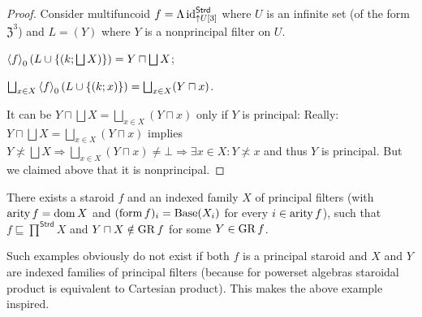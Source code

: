 \begin{proof}
Consider multifuncoid $f=\Lambda\operatorname{id}_{\uparrow U[3]}^{\mathsf{Strd}}$
where $U$ is an infinite set (of the form $\mathfrak{Z}^{3}$) and
$L=(Y)$ where $Y$ is a nonprincipal filter on $U$.

$\left\langle f\right\rangle_{0}\left(L\cup\left\{ \left(k;\bigsqcup X\right)\right\} \right)=Y\sqcap\bigsqcup X$;

$\bigsqcup_{x\in X}\left\langle f\right\rangle_{0}(L\cup\{(k;x)\})=\bigsqcup_{x\in X}(Y\sqcap x)$.

It can be $Y\sqcap\bigsqcup X=\bigsqcup_{x\in X}(Y\sqcap x)$ only
if $Y$ is principal: Really: $Y\sqcap\bigsqcup X=\bigsqcup_{x\in X}(Y\sqcap x)$
implies $Y\nasymp\bigsqcup X\Rightarrow\bigsqcup_{x\in X}(Y\sqcap x)\neq\bot\Rightarrow\exists x\in X:Y\nasymp x$
and thus $Y$ is principal. But we claimed above that it is nonprincipal.\end{proof}
\begin{example}
There exists a staroid $f$ and an indexed family $X$ of principal
filters (with $\operatorname{arity} f=\operatorname{dom} X$ and $(\operatorname{form} f)_{i}=\operatorname{Base}(X_{i})$
for every $i\in\operatorname{arity} f$), such that $f\sqsubseteq\prod^{\mathsf{Strd}}X$
and $Y\sqcap X\notin\operatorname{GR} f$ for some $Y\in\operatorname{GR} f$.\end{example}
\begin{rem}
Such examples obviously do not exist if both $f$ is a principal staroid
and $X$ and $Y$ are indexed families of principal filters (because
for powerset algebras staroidal product is equivalent to Cartesian
product). This makes the above example inspired.\end{rem}
